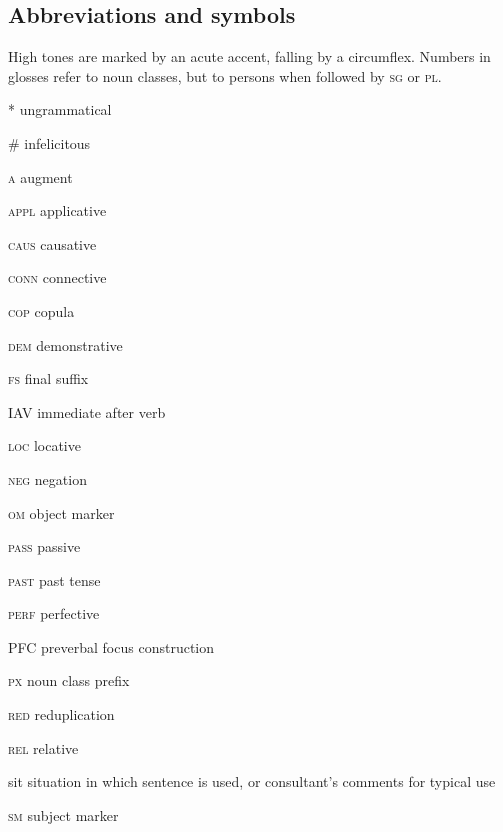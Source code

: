 \documentclass[output=paper]{langsci/langscibook}
\begin{document}
\subsection{Abbreviations and symbols}

High tones are marked by an acute accent, falling by a circumflex. Numbers in glosses refer to noun classes, but to persons when followed by \textsc{sg} or \textsc{pl}.

*  ungrammatical

\#  infelicitous

\textsc{a}  augment

\textsc{appl}  applicative

\textsc{caus}  causative

\textsc{conn}  connective

\textsc{cop}  copula

\textsc{dem}  demonstrative

\textsc{fs}  final suffix

IAV  immediate after verb

\textsc{loc}  locative

\textsc{neg}  negation

\textsc{om}  object marker

\textsc{pass}  passive

\textsc{past}  past tense

\textsc{perf}  perfective

PFC  preverbal focus construction

\textsc{px}  noun class prefix

\textsc{red}  reduplication

\textsc{rel}  relative

sit  situation in which sentence is used, or consultant’s comments for typical use

\textsc{sm}  subject marker
\end{document}
